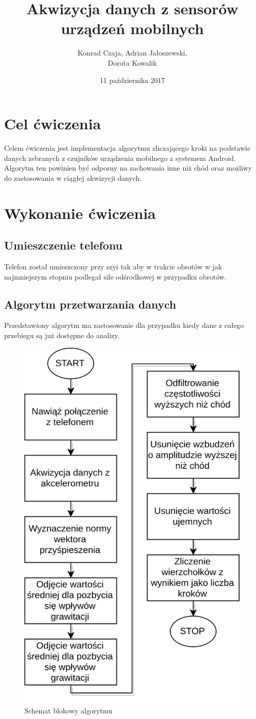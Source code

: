 \documentclass[a4paper, 12pt, titlepage]{article}
\author{Konrad Czaja, Adrian Jałoszewski,\\Dorota Kowalik}
\title{Akwizycja danych z sensorów urządzeń mobilnych}
\date{11 października 2017}
\begin{document}
    \maketitle
	\section{Cel ćwiczenia}
        Celem ćwiczenia jest implementacja algorytmu zliczającego 
        kroki na podstawie danych zebranych z czujników urządzenia
        mobilnego z systemem Android. Algorytm ten powinien być
        odporny na zachowania inne niż chód oraz możliwy do 
        zastosowania w ciągłej akwizycji danych.
    \section{Wykonanie ćwiczenia}
        \subsection{Umieszczenie telefonu}
            Telefon został umieszczony przy szyi tak aby w trakcie
            obrotów w jak najmniejszym stopniu podlegał sile
            odśrodkowej w przypadku obrotów.
        \subsection{Algorytm przetwarzania danych}
            Przedstawiony algorytm ma zastosowanie dla przypadku kiedy
            dane z całego przebiegu są już dostępne do analizy.
            \begin{figure}[H]
                \centering
                \includegraphics[width=0.5\columnwidth]{algorytm.png}
                \caption{Schemat blokowy algorytmu}
            \end{figure}\noindent
\end{document}
